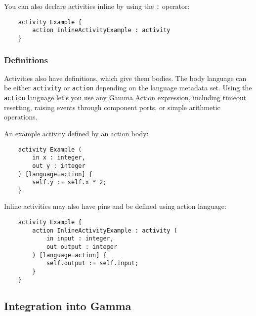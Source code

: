 You can also declare activities inline by using the \verb|:| operator:

\begin{lstlisting}
	activity Example {
		action InlineActivityExample : activity
	}
\end{lstlisting}

\subsubsection*{Definitions}

Activities also have definitions, which give them bodies. The body language can be either \verb|activity| or \verb|action| depending on the language metadata set. Using the \verb|action| language let's you use any Gamma Action expression, including timeout resetting, raising events through component ports, or simple arithmetic operations.

An example activity defined by an action body:

\begin{lstlisting}
	activity Example (
		in x : integer,
		out y : integer
	) [language=action] {
		self.y := self.x * 2;
	}
\end{lstlisting}

Inline activities may also have pins and be defined using action language:

\begin{lstlisting}
	activity Example {
		action InlineActivityExample : activity (
			in input : integer,
			out output : integer
		) [language=action] {
			self.output := self.input;
		}
	}
\end{lstlisting}

\subsection{Integration into Gamma}\label{ssec:integration-into-gamma}
